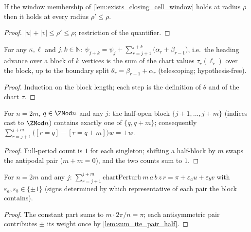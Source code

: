 \begin{lemma}
  \label{lem:closing_cell_window_mono}
  If the window membership of \cref{lem:exists_closing_cell_window} holds at
  radius $\rho$ then it holds at every radius $\rho' \le \rho$.
\end{lemma}
\begin{proof}

\leanok
  $|u|+|v| \le \rho' \le \rho$; restriction of the quantifier.
\end{proof}

\begin{lemma}
  \label{lem:heading_add_eq_chart_block}
  For any $\kappa, \ell$ and $j, k \in \mathbb{N}$:
  $\psi_{j+k} = \psi_j + \sum_{r=j+1}^{j+k} \bigl(\alpha_r + \beta_{r-1}\bigr)$,
  i.e.\ the heading advance over a block of $k$ vertices is the sum of the
  chart values $\tau_r(\ell_r)$ over the block, up to the boundary split
  $\theta_r = \beta_{r-1} + \alpha_r$ (telescoping; hypothesis-free).
\end{lemma}
\begin{proof}

\leanok
  Induction on the block length; each step is the definition of
  $\theta$ and of the chart $\tau$.
\end{proof}

\begin{lemma}
  \label{lem:sum_ite_pair_half}
  For $n = 2m$, $q \in \ZMod n$ and any $j$: the half-open block
  $\{j+1, \dots, j+m\}$ (indices cast to $\ZMod n$) contains exactly one of
  $\{q, q+m\}$; consequently
  $\sum_{r=j+1}^{j+m} \bigl([r = q] - [r = q+m]\bigr) w = \pm w$.
\end{lemma}
\begin{proof}

\leanok
  Full-period count is $1$ for each singleton; shifting a half-block by $m$
  swaps the antipodal pair ($m + m = 0$), and the two counts sum to $1$.
\end{proof}

\begin{lemma}
  \label{lem:sum_chart_perturb_block}
  For $n = 2m$ and any $j$: $\sum_{r=j+1}^{j+m}
  \mathrm{chartPerturb}\,m\,a\,b\,z\,r = \pi + \varepsilon_a u +
  \varepsilon_b v$ with $\varepsilon_a, \varepsilon_b \in \{\pm1\}$ (signs
  determined by which representative of each pair the block contains).
\end{lemma}
\begin{proof}

\leanok
  The constant part sums to $m \cdot 2\pi/n = \pi$; each antisymmetric pair
  contributes $\pm$ its weight once by \cref{lem:sum_ite_pair_half}.
\end{proof}

